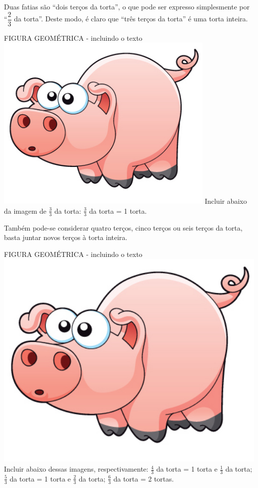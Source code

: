 \documentclass[a4,12pt]{book}
\begin{document}
Duas fatias são ``dois terços da torta'', o que pode ser expresso simplesmente por ``$\dfrac{2}{3}$ da torta''. Deste modo, é claro que ``três terços da torta'' é uma torta inteira.

\begin{imagem*}[breakable]{}{}   FIGURA GEOMÉTRICA - incluindo o texto  \mbox{} \newline        \includegraphics[width=300pt, keepaspectratio]{pig}
  Incluir abaixo da imagem de   $\frac{3}{3}$   da torta:   $\frac{3}{3}$   da torta = 1 torta.\end{imagem*}

Também pode-se considerar quatro terços, cinco terços ou seis terços da torta, basta juntar novos terços à torta inteira.

\begin{imagem*}[breakable]{}{}    FIGURA GEOMÉTRICA - incluindo o texto  \mbox{} \newline         \includegraphics[width=540pt, keepaspectratio]{pig}
  Incluir abaixo dessas imagens, respectivamente:
  $\frac{4}{3}$   da torta = 1 torta e   $\frac{1}{3}$   da torta;
  $\frac{5}{3}$   da torta = 1 torta e   $\frac{2}{3}$   da torta;
  $\frac{6}{3}$   da torta = 2 tortas.
\end{imagem*}
\end{document}

